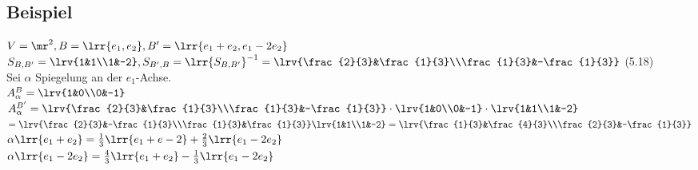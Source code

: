 \subsection{Beispiel}
	$V=\mr^2, B=\lrr{e_1,e_2}, B'=\lrr{e_1+e_2,e_1-2e_2}$\\
	$S_{B,B'}=\lrv{1&1\\1&-2}, S_{B',B}=\lrr{S_{B,B'}}^{-1}=\lrv{\frac{2}{3}&\frac{1}{3}\\\frac{1}{3}&-\frac{1}{3}}$ (5.18)\\
	Sei $\alpha$ Spiegelung an der $e_1$-Achse.\\
	$A_\alpha^B=\lrv{1&0\\0&-1}$\\
	$A_\alpha^{B'}=\lrv{\frac{2}{3}&\frac{1}{3}\\\frac{1}{3}&-\frac{1}{3}}\cdot\lrv{1&0\\0&-1}\cdot\lrv{1&1\\1&-2}$\\
	$=\lrv{\frac{2}{3}&-\frac{1}{3}\\\frac{1}{3}&\frac{1}{3}}\lrv{1&1\\1&-2}=\lrv{\frac{1}{3}&\frac{4}{3}\\\frac{2}{3}&-\frac{1}{3}}$\\
	$\alpha\lrr{e_1+e_2}=\frac{1}{3}\lrr{e_1+e-2}+\frac{2}{3}\lrr{e_1-2e_2}$\\
	$\alpha\lrr{e_1-2e_2}=\frac{4}{3}\lrr{e_1+e_2}-\frac{1}{3}\lrr{e_1-2e_2}$
